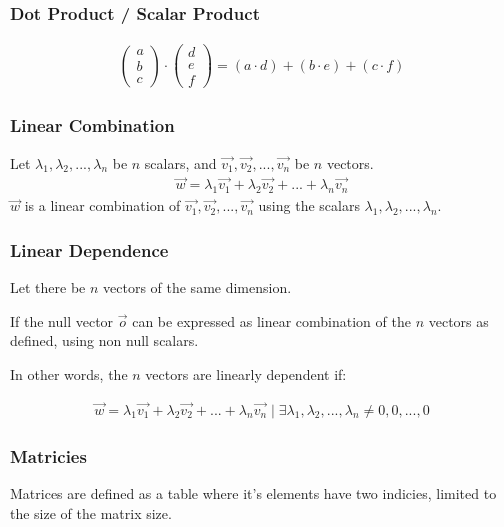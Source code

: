 \documentclass{article}
\begin{document}
\subsubsection{Dot Product / Scalar Product}
\begin{align*}
    \begin{pmatrix} a \\ b \\ c \end{pmatrix} \cdot \begin{pmatrix} d \\ e \\ f \end{pmatrix} = (a \cdot d) + (b \cdot e) + (c \cdot f)
\end{align*}
\subsubsection{Linear Combination}
Let $ \lambda_1, \lambda_2, ... , \lambda_n $ be $n$ scalars, and $ \vec{v_1}, \vec{v_2}, ..., \vec{v_n} $ be $n$ vectors.
\begin{align*}
    \vec{w} = \lambda_1 \vec{v_1} + \lambda_2 \vec{v_2} + ... + \lambda_n \vec{v_n}
\end{align*}
$ \vec{w} $ is a linear combination of $ \vec{v_1}, \vec{v_2}, ..., \vec{v_n} $ using the scalars $ \lambda_1, \lambda_2, ... , \lambda_n $.

\subsubsection{Linear Dependence}

Let there be $n$ vectors of the same dimension.

If the null vector $ \vec{o} $ can be expressed as linear combination of the $n$ vectors as defined, using non null scalars.

In other words, the $n$ vectors are linearly dependent if:

\begin{align*}
    \vec{w} = \lambda_1 \vec{v_1} + \lambda_2 \vec{v_2} + ... + \lambda_n \vec{v_n} \mid \exists \lambda_1, \lambda_2, ..., \lambda_n \neq 0, 0, ..., 0
\end{align*}
\subsubsection{Matricies}

Matrices are defined as a table where it's elements have two indicies, limited to the size of the matrix size.
\end{document}
